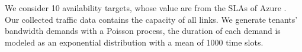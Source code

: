 \documentclass[sigconf]{acmart}
\begin{document}
We consider 10 availability targets, whose value are from the SLAs of Azure \cite{azure}.
Our collected traffic data contains the capacity of all links.
We generate tenants' bandwidth demands with a Poisson process, the duration of each demand is modeled as an exponential distribution with a mean of 1000 time slots.





\end{document}
